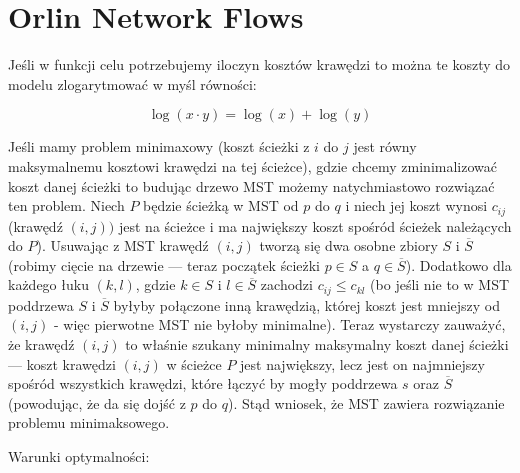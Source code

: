 \chapter{Orlin Network Flows}
\thispagestyle{chapterBeginStyle}

Jeśli w funkcji celu potrzebujemy iloczyn kosztów krawędzi to można te koszty do modelu zlogarytmować w myśl równości:

\begin{equation}
\log \left( x \cdot y \right) = \log \left( x \right) + \log \left( y \right)
\end{equation}

Jeśli mamy problem minimaxowy (koszt ścieżki z $i$ do $j$ jest równy maksymalnemu kosztowi krawędzi na tej ścieżce), gdzie chcemy zminimalizować koszt danej ścieżki to budując drzewo MST możemy natychmiastowo rozwiązać ten problem. Niech $P$ będzie ścieżką w MST od $p$ do $q$ i niech jej koszt wynosi $c_{ij}$ (krawędź $\left( i, j \right))$ jest na ścieżce i ma największy koszt spośród ścieżek należących do $P$). Usuwając z MST krawędź $\left( i, j \right)$ tworzą się dwa osobne zbiory $S$ i $\overline{S}$ (robimy cięcie na drzewie --- teraz początek ścieżki $p \in S$ a $q \in \overline{S}$). Dodatkowo dla każdego łuku $\left( k, l \right)$, gdzie $k \in S$ i $l \in \overline{S}$ zachodzi $c_{ij} \leqslant c_{kl}$ (bo jeśli nie to w MST poddrzewa $S$ i $\overline{S}$ byłyby połączone inną krawędzią, której koszt jest mniejszy od $\left( i, j \right)$ - więc pierwotne MST nie byłoby minimalne). Teraz wystarczy zauważyć, że krawędź $\left( i, j \right)$ to właśnie szukany minimalny maksymalny koszt danej ścieżki --- koszt krawędzi $\left( i, j \right)$ w ścieżce $P$ jest największy, lecz jest on najmniejszy spośród wszystkich krawędzi, które łączyć by mogły poddrzewa $s$ oraz $\overline{S}$ (powodując, że da się dojść z $p$ do $q$). Stąd wniosek, że MST zawiera rozwiązanie problemu minimaksowego.

Warunki optymalności:

